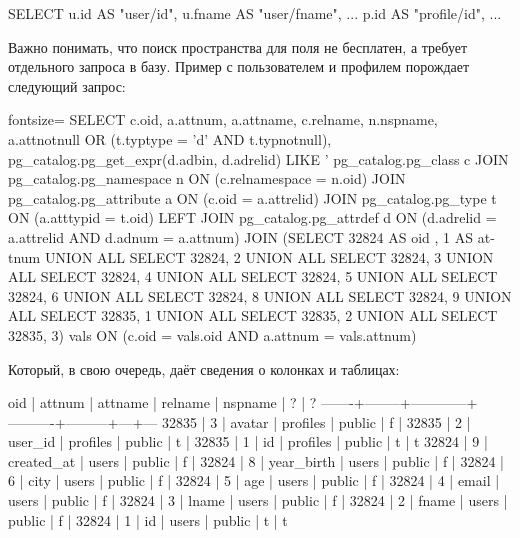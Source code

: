 \begin{english}
  \begin{sql}
SELECT
  u.id     AS "user/id",
  u.fname  AS "user/fname",
  ...
  p.id     AS "profile/id",
  ...
  \end{sql}
\end{english}

Важно понимать, что поиск пространства для поля не бесплатен, а требует отдельного запроса в базу. Пример с пользователем и профилем порождает следующий запрос:

\begin{english}
  \begin{sql*}{fontsize=\small}
SELECT c.oid, a.attnum, a.attname, c.relname, n.nspname,
a.attnotnull OR (t.typtype = 'd' AND t.typnotnull),
pg_catalog.pg_get_expr(d.adbin, d.adrelid) LIKE '%
pg_catalog.pg_class c JOIN pg_catalog.pg_namespace n
ON (c.relnamespace = n.oid) JOIN pg_catalog.pg_attribute a
ON (c.oid = a.attrelid) JOIN pg_catalog.pg_type t ON (a.atttypid
= t.oid) LEFT JOIN pg_catalog.pg_attrdef d ON (d.adrelid =
a.attrelid AND d.adnum = a.attnum) JOIN (SELECT 32824 AS oid , 1
AS attnum UNION ALL SELECT 32824, 2 UNION ALL SELECT 32824, 3
UNION ALL SELECT 32824, 4 UNION ALL SELECT 32824, 5 UNION ALL
SELECT 32824, 6 UNION ALL SELECT 32824, 8 UNION ALL SELECT 32824,
9 UNION ALL SELECT 32835, 1 UNION ALL SELECT 32835, 2 UNION ALL
SELECT 32835, 3) vals ON (c.oid = vals.oid AND a.attnum =
vals.attnum)
  \end{sql*}
\end{english}

Который, в свою очередь, даёт сведения о колонках и таблицах:

\begin{english}
  \begin{text}
  oid  | attnum |  attname   | relname  | nspname | ? | ?
-------+--------+------------+----------+---------+---+---
 32835 |      3 | avatar     | profiles | public  | f |
 32835 |      2 | user_id    | profiles | public  | t |
 32835 |      1 | id         | profiles | public  | t | t
 32824 |      9 | created_at | users    | public  | f |
 32824 |      8 | year_birth | users    | public  | f |
 32824 |      6 | city       | users    | public  | f |
 32824 |      5 | age        | users    | public  | f |
 32824 |      4 | email      | users    | public  | f |
 32824 |      3 | lname      | users    | public  | f |
 32824 |      2 | fname      | users    | public  | f |
 32824 |      1 | id         | users    | public  | t | t
  \end{text}
\end{english}

